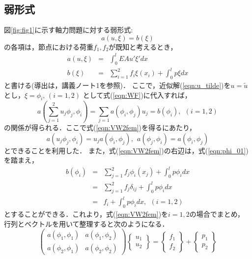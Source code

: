 \documentclass[10pt,a4j]{jarticle}
\begin{document}
\subsection{弱形式}
図\ref{fig:fig1}に示す軸力問題に対する弱形式:
\begin{equation}
	a(u,\xi)=b(\xi)
	\label{eqn:WF}
\end{equation}
の各項は，節点における荷重$f_1,f_2$が既知と考えるとき，
\begin{eqnarray}
	a(u,\xi) &= & \int_{0}^{l}EAu'\xi'dx 
	\label{eqn:def_a}
	\\
	b(\xi) &= & \sum_{i=1}^2 f_i\xi(x_i) + \int_{0}^{l}p\xi dx
	\label{eqn:def_b}
\end{eqnarray}
と書ける(導出は，講義ノート1を参照)．
ここで，近似解(\ref{eqn:u_tilde})を$u=\tilde u$とし，$\xi=\phi_i,\,(i=1,2)$
として式(\ref{eqn:WF})に代入すれば，
\begin{equation}
	a\left(\sum_{j=1}^2u_j\phi_j, \phi_i \right)
	=
	\sum_{j=1}  a\left( \phi_i, \phi_j \right)u_j=b(\phi_i), \ \ (i=1,2)
	\label{eqn:VW2fem}
\end{equation}
の関係が得られる．ここで式(\ref{eqn:VW2fem})を得るにあたり，
\begin{equation}
	a(u_j\phi_j,\phi_i)=u_ja(\phi_i,\phi_j), \ \ a(\phi_j,\phi_i)=a(\phi_i,\phi_j)
\end{equation}
とできることを利用した．
また，式(\ref{eqn:VW2fem})の右辺は，式(\ref{eqn:phi_01})を踏まえ，
\begin{eqnarray}
	b(\phi_i) &=&
	\sum_{j=1}^2 f_j\phi_i(x_j) + \int_{0}^{l}p\phi_i dx \\
	&=&
	\sum_{j=1}^2 f_j\delta_{ij} + \int_{0}^{l}p\phi_i dx \\
	&=&
	f_i + \int_{0}^{l}p\phi_i dx, \ \ (i=1,2)
	\label{eqn:}
\end{eqnarray}
とすることができる．これより，式(\ref{eqn:VW2fem})を$i=1,2$の場合でまとめ，
行列とベクトルを用いて整理すると次のようになる．
\begin{equation}
	\left(
	\begin{array}{cc}
		a(\phi_1,\phi_1) & a(\phi_1,\phi_2)  \\
		a(\phi_2,\phi_1) & a(\phi_2,\phi_2)  
	\end{array}
	\right)
	\left\{
	\begin{array}{c}
		u_1 \\
		u_2
	\end{array}
	\right\}
	=
	\left\{
	\begin{array}{c}
		f_1 \\
		f_2 
	\end{array}
	\right\}
	+
	\left\{
	\begin{array}{c}
		p_1 \\
		p_2
	\end{array}
	\right\}
	\label{eqn:fem_n1}
\end{equation}
\end{document}
